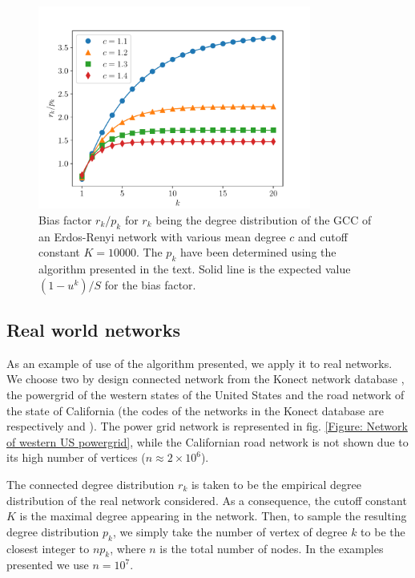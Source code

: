 \documentclass[
11pt, %
american, %
singlespacing, %
final, %
nolistspacing, %
liststotoc, %
headsepline, %
]{MastersDoctoralThesis} %
\begin{document}
\begin{figure}
	\includegraphics[width=0.8\textwidth]{ER_reconstruction.pdf}
	\caption{Bias factor $r_k/p_k$ for $r_k$ being the degree distribution of the GCC of an Erdos-Renyi network with various mean degree $c$ and cutoff constant $K = 10000$. The $p_k$ have been determined using the algorithm presented in the text. Solid line is the expected value $(1 - u^k)/S$ for the bias factor.}
	\label{Figure: Erdos-Renyi reconstruction}
\end{figure}

\subsection{Real world networks}

As an example of use of the algorithm presented, we apply it to real networks. We choose two by design connected network from the Konect network database \cite{kunegis2013konect}, the powergrid of the western states of the United States \cite{watts1998collective} and the road network of the state of California \cite{leskovec2008community} (the codes of the networks in the Konect database are respectively  and ). The power grid network is represented in fig. \ref{Figure: Network of western US powergrid}, while the Californian road network is not shown due to its high number of vertices ($n \approx 2 \times 10^6$).

The connected degree distribution $r_k$ is taken to be the empirical degree distribution of the real network considered. As a consequence, the cutoff constant $K$ is the maximal degree appearing in the network. Then, to sample the resulting degree distribution $p_k$, we simply take the number of vertex of degree $k$ to be the closest integer to $n p_k$, where $n$ is the total number of nodes. In the examples presented we use $n = 10^7$.
\end{document}
